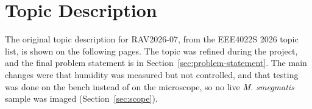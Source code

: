 \chapter{Topic Description}
\label{app:topic}

The original topic description for RAV2026-07, from the EEE4022S 2026 topic list, is shown on the following pages. The topic was refined during the project, and the final problem statement is in Section~\ref{sec:problem-statement}. The main changes were that humidity was measured but not controlled, and that testing was done on the bench instead of on the microscope, so no live \textit{M. smegmatis} sample was imaged (Section~\ref{sec:scope}).


